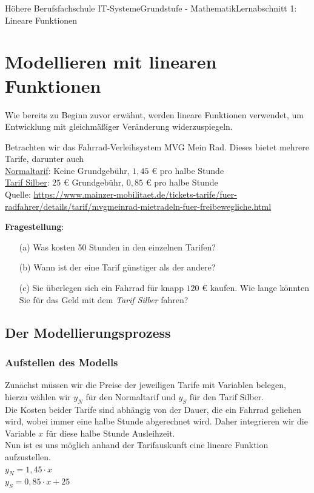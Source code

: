 \documentclass[11pt,twocolumn,oneside,openany,headings=optiontotoc,11pt,numbers=noenddot]{article}
\begin{document}
\begin{worksheet}{Höhere Berufsfachschule IT-Systeme}{Grundstufe - 
		Mathematik}{Lernabschnitt 1: Lineare Funktionen}
		\section{Modellieren mit linearen Funktionen}
		Wie bereits zu Beginn zuvor erwähnt, werden lineare Funktionen verwendet, um Entwicklung mit gleichmäßiger Veränderung widerzuspiegeln.\\
		\par\noindent
		Betrachten wir das Fahrrad-Verleihsystem \glqq{}MVG Mein Rad\grqq{}. Dieses bietet mehrere Tarife, darunter auch\\
		\underline{Normaltarif}: Keine Grundgebühr, \(1,45\) \euro{} pro halbe Stunde\\
		\underline{Tarif Silber}: \(25\) \euro{} Grundgebühr, \(0,85\) \euro{} pro halbe Stunde\\
		\tiny{Quelle: \url{https://www.mainzer-mobilitaet.de/tickets-tarife/fuer-radfahrer/details/tarif/mvgmeinrad-mietradeln-fuer-freibewegliche.html}}\\
		\normalsize
		\par\noindent
		\textbf{Fragestellung}:
		\begin{itemize}
			\item[(a)] Was kosten 50 Stunden in den einzelnen Tarifen?
			\item[(b)] Wann ist der eine Tarif günstiger als der andere?
			\item[(c)] Sie überlegen sich ein Fahrrad für knapp \(120\) \euro{} kaufen. Wie lange könnten Sie für das Geld mit dem \textit{Tarif Silber} fahren?
		\end{itemize}
		\subsection{Der Modellierungsprozess}
		\subsubsection{Aufstellen des Modells}
		Zunächst müssen wir die Preise der jeweiligen Tarife mit Variablen belegen, hierzu wählen wir \(y_N\) für den Normaltarif und \(y_S\) für den Tarif Silber.\\
		Die Kosten beider Tarife sind abhängig von der Dauer, die ein Fahrrad geliehen wird, wobei immer eine halbe Stunde abgerechnet wird. Daher integrieren wir die Variable \(x\) für diese halbe Stunde Ausleihzeit.\\
		Nun ist es uns möglich anhand der Tarifauskunft eine lineare Funktion aufzustellen.\\
		\(y_N = 1,45\cdot{}x\)\\
		\(y_S = 0,85\cdot{}x + 25\)\\

\end{worksheet}
\end{document}
